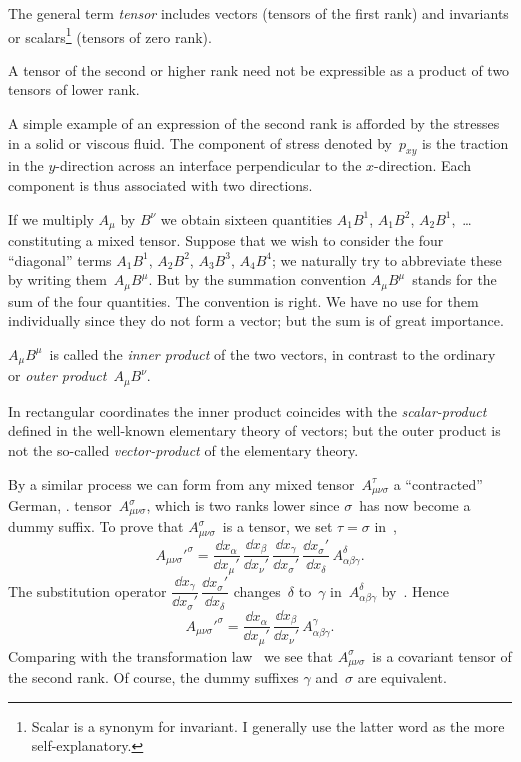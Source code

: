 \documentclass[12pt]{book}
\begin{document}
The general term \emph{tensor} includes vectors (tensors of the first rank) and
invariants or scalars\footnote
  {Scalar is a synonym for invariant. I generally use the latter word as the more self-explanatory.}
%
(tensors of zero rank).

A tensor of the second or higher rank need not be expressible as a product
of two tensors of lower rank.

A simple example of an expression of the second rank is afforded by the
stresses in a solid or viscous fluid. The component of stress denoted by~$p_{xy}$
is the traction in the $y$-direction across an interface perpendicular to the
$x$-direction. Each component is thus associated with two directions.


If we multiply $A_{\mu}$ by $B^{\nu}$ we obtain sixteen quantities $A_{1}B^{1}$, $A_{1}B^{2}$, $A_{2}B^{1}$,~\dots
constituting a mixed tensor. Suppose that we wish to consider the four
``diagonal'' terms $A_{1}B^{1}$, $A_{2}B^{2}$, $A_{3}B^{3}$, $A_{4}B^{4}$; we naturally try to abbreviate
these by writing them~$A_{\mu}B^{\mu}$. But by the summation convention $A_{\mu}B^{\mu}$~stands
for the sum of the four quantities. The convention is right. We have no use
for them individually since they do not form a vector; but the sum is of great
importance.

$A_{\mu}B^{\mu}$~is called the \emph{inner product} of the two vectors, in contrast to the
%
%
%
%
ordinary or \emph{outer product}~$A_{\mu}B^{\nu}$.

In rectangular coordinates the inner product coincides with the \emph{scalar-product}
defined in the well-known elementary theory of vectors; but the outer
product is not the so-called \emph{vector-product} of the elementary theory.

By a similar process we can form from any mixed tensor~$A_{\mu\nu\sigma}^{\tau}$ a ``contracted\footnotemark''\footnotetext
  {German, .}%
tensor~$A_{\mu\nu\sigma}^{\sigma}$, which is two ranks lower since $\sigma$~has now become a
dummy suffix. To prove that $A_{\mu\nu\sigma}^{\sigma}$~is a tensor, we set $\tau = \sigma$ in~,
\[
A_{\mu\nu\sigma}'^{\sigma}
= \frac{\dd x_{\alpha}}{\dd x_{\mu}'}\,
  \frac{\dd x_{\beta}}{\dd x_{\nu}'}\,
  \frac{\dd x_{\gamma}}{\dd x_{\sigma}'}\,
  \frac{\dd x_{\sigma}'}{\dd x_{\delta}}\, A_{\alpha\beta\gamma}^{\delta}.
\]
The substitution operator $\dfrac{\dd x_{\gamma}}{\dd x_{\sigma}'}\, \dfrac{\dd x_{\sigma}'}{\dd x_{\delta}}$ changes~$\delta$ to~$\gamma$ in~$A_{\alpha\beta\gamma}^{\delta}$ by~. Hence
\[
A_{\mu\nu\sigma}'^{\sigma}
= \frac{\dd x_{\alpha}}{\dd x_{\mu}'}\,
  \frac{\dd x_{\beta}}{\dd x_{\nu}'}\, A_{\alpha\beta\gamma}^{\gamma}.
\]
Comparing with the transformation law~ we see that $A_{\mu\nu\sigma}^{\sigma}$~is a covariant
tensor of the second rank. Of course, the dummy suffixes $\gamma$ and~$\sigma$ are equivalent.
\end{document}
